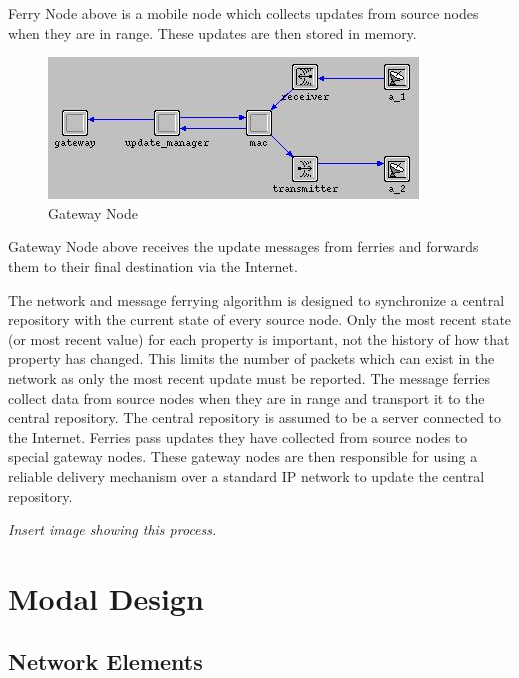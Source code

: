 Ferry Node above is a mobile node which collects updates from source nodes when they are in range. These updates are then stored in memory.

\begin{figure}[h]
    \centering
    \includegraphics[width=.5\textwidth]{images/gateway}
    \caption{Gateway Node}
    \label{fig:Gateway}
\end{figure}

Gateway Node above receives the update messages from ferries and forwards them to their final destination via the Internet. 


The network and message ferrying algorithm is designed to synchronize a central repository with the current state of every source node.
Only the most recent state (or most recent value) for each property is important, not the history of how that property has changed.
This limits the number of packets which can exist in the network as only the most recent update must be reported.
The message ferries collect data from source nodes when they are in range and transport it to the central repository.
The central repository is assumed to be a server connected to the Internet.
Ferries pass updates they have collected from source nodes to special gateway nodes.
These gateway nodes are then responsible for using a reliable delivery mechanism over a standard IP network to update the central repository.

\emph{Insert image showing this process.}

\section{Modal Design}
\subsection{Network Elements}


